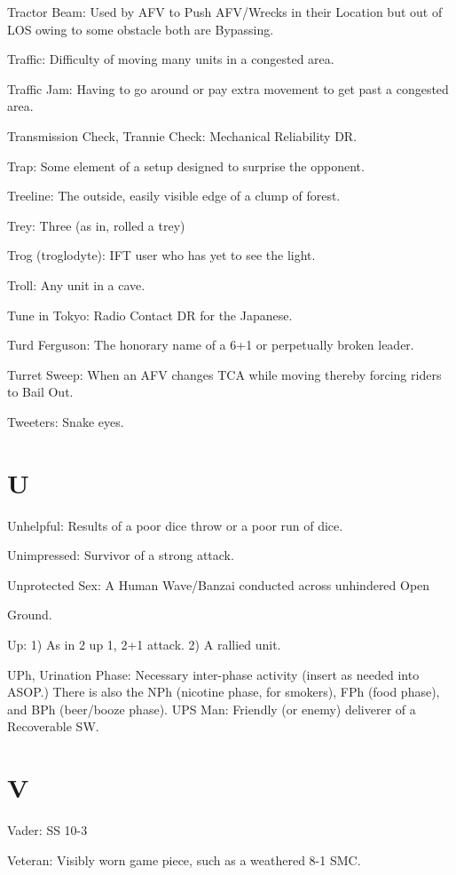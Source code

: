 \documentclass[letterpaper]{article}
\begin{document}
Tractor Beam: Used by AFV to Push AFV/Wrecks in their Location but out of LOS owing to some obstacle both are Bypassing.

Traffic: Difficulty of moving many units in a congested area.

Traffic Jam: Having to go around or pay extra movement to get past a congested area.

Transmission Check, Trannie Check: Mechanical Reliability DR.

Trap: Some element of a setup designed to surprise the opponent.

Treeline: The outside, easily visible edge of a clump of forest.

Trey: Three (as in, rolled a trey)

Trog (troglodyte): IFT user who has yet to see the light.

Troll: Any unit in a cave.

Tune in Tokyo: Radio Contact DR for the Japanese.

Turd Ferguson: The honorary name of a 6+1 or perpetually broken leader.

Turret Sweep: When an AFV changes TCA while moving thereby forcing riders to Bail Out.

Tweeters: Snake eyes.

\section{U}

Unhelpful: Results of a poor dice throw or a poor run of dice.

Unimpressed: Survivor of a strong attack.

Unprotected Sex: A Human Wave/Banzai conducted across unhindered Open

Ground.

Up: 1) As in 2 up 1, 2+1 attack. 2) A rallied unit.

UPh, Urination Phase: Necessary inter-phase activity (insert as needed
into ASOP.) There is also the NPh (nicotine phase, for smokers), FPh (food phase), and BPh (beer/booze phase).
UPS Man: Friendly (or enemy) deliverer of a Recoverable SW.

\section{V}

Vader: SS 10-3

Veteran: Visibly worn game piece, such as a weathered 8-1 SMC.
\end{document}
